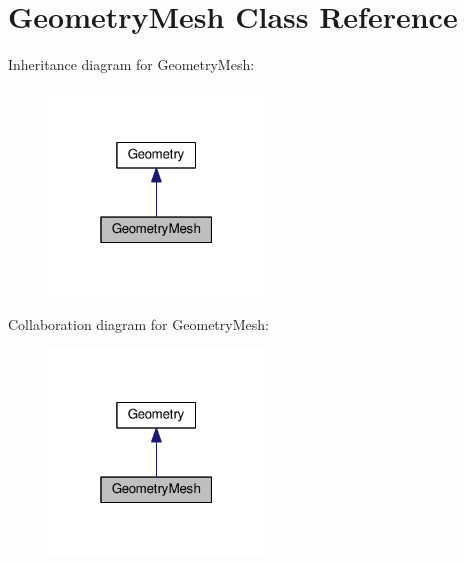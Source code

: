 \section{Geometry\+Mesh Class Reference}
\label{class_geometry_mesh}


Inheritance diagram for Geometry\+Mesh\+:\nopagebreak
\begin{figure}[H]
\begin{center}
\leavevmode
\includegraphics[width=163pt]{class_geometry_mesh__inherit__graph}
\end{center}
\end{figure}


Collaboration diagram for Geometry\+Mesh\+:\nopagebreak
\begin{figure}[H]
\begin{center}
\leavevmode
\includegraphics[width=163pt]{class_geometry_mesh__coll__graph}
\end{center}
\end{figure}
